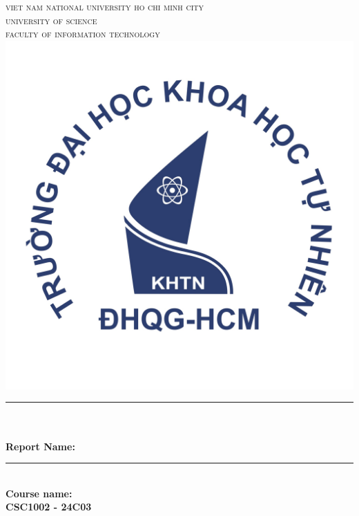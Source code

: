 
\begin{titlepage}
    
    \newcommand{\HRule}{\rule{\linewidth}{0.5mm}}
    \centering
    
    \textsc{\LARGE viet nam national university ho chi minh city}\\ [0.5cm]
    \textsc{\large university of science} \\ [0.5cm]
    \textsc{\large faculty of information technology} \\ [0.5cm]
    
    \includegraphics[scale = 0.36]{figures/hcmus-logo.jpeg} \\ [0cm]
    \HRule \\ [0.2cm]
    {
    \huge{\bfseries{\reporttitle}}\\[0.2cm]
    \Large{\bfseries{Report Name: \reportname}}
    }
    \\[0.2cm]
    \HRule \\ [0.2cm]
    
    \textbf{\large Course name: \coursename}\\ [0.3cm]
    \textbf{\large CSC1002 - 24C03} \\ [1.3cm]
    

\end{titlepage}

